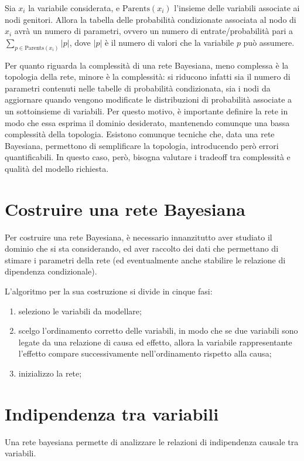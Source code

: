 Sia $x_i$ la variabile considerata, e $\text{Parents}(x_i)$ l'insieme
delle variabili associate ai nodi genitori. Allora la tabella delle
probabilità condizionate associata al nodo di $x_i$ avrà un numero
di parametri, ovvero un numero di entrate/probabilità pari a
$\sum_{p \in \text{Parents}(x_i)} |p|$, dove $|p|$ è il numero di valori
che la variabile $p$ può assumere.

Per quanto riguarda la complessità di una rete Bayesiana, meno complessa
è la topologia della rete, minore è la complessità: si riducono infatti
sia il numero di parametri contenuti nelle tabelle di probabilità
condizionata, sia i nodi da aggiornare quando vengono modificate le distribuzioni
di probabilità associate a un sottoinsieme di variabili.
Per questo motivo, è importante definire la rete in modo che essa esprima
il dominio desiderato, mantenendo comunque una bassa complessità della topologia.
Esistono comunque tecniche che, data una rete Bayesiana, permettono di
semplificare la topologia, introducendo però errori quantificabili. In questo
caso, però, bisogna valutare i tradeoff tra complessità e qualità del modello
richiesta.

\section{Costruire una rete Bayesiana}
Per costruire una rete Bayesiana, è necessario innanzitutto aver studiato
il dominio che si sta considerando, ed aver raccolto dei dati che
permettano di stimare i parametri della rete (ed eventualmente anche
stabilire le relazione di dipendenza condizionale).

L'algoritmo per la sua costruzione si divide in cinque fasi:
\begin{enumerate}
    \item seleziono le variabili da modellare;
    \item scelgo l'ordinamento corretto delle variabili, in modo che
    se due variabili sono legate da una relazione di causa ed effetto,
    allora la variabile rappresentante l'effetto compare successivamente
    nell'ordinamento rispetto alla causa;
    \item inizializzo la rete;
\end{enumerate}

\section{Indipendenza tra variabili}
Una rete bayesiana permette di analizzare le relazioni di indipendenza causale
tra variabili.

